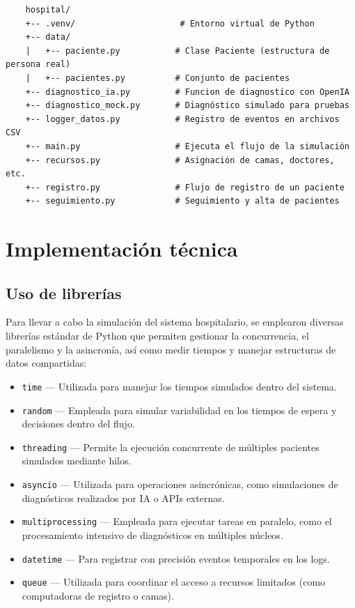 \documentclass{article}
\begin{document}
\begin{verbatim}
    hospital/
    +-- .venv/                     # Entorno virtual de Python
    +-- data/                      
    |   +-- paciente.py           # Clase Paciente (estructura de persona real) 
    |   +-- pacientes.py          # Conjunto de pacientes
    +-- diagnostico_ia.py         # Funcion de diagnostico con OpenIA
    +-- diagnostico_mock.py       # Diagnóstico simulado para pruebas
    +-- logger_datos.py           # Registro de eventos en archivos CSV
    +-- main.py                   # Ejecuta el flujo de la simulación
    +-- recursos.py               # Asignación de camas, doctores, etc.
    +-- registro.py               # Flujo de registro de un paciente
    +-- seguimiento.py            # Seguimiento y alta de pacientes
\end{verbatim}

\section{Implementación técnica}

\subsection{Uso de librerías}

Para llevar a cabo la simulación del sistema hospitalario, se emplearon diversas librerías estándar de Python que permiten gestionar la concurrencia, el paralelismo y la asincronía, así como medir tiempos y manejar estructuras de datos compartidas:

\begin{itemize}
    \item \texttt{time} — Utilizada para manejar los tiempos simulados dentro del sistema.
    \item \texttt{random} — Empleada para simular variabilidad en los tiempos de espera y decisiones dentro del flujo.
    \item \texttt{threading} — Permite la ejecución concurrente de múltiples pacientes simulados mediante hilos.
    \item \texttt{asyncio} — Utilizada para operaciones asincrónicas, como simulaciones de diagnósticos realizados por IA o APIs externas.
    \item \texttt{multiprocessing} — Empleada para ejecutar tareas en paralelo, como el procesamiento intensivo de diagnósticos en múltiples núcleos.
    \item \texttt{datetime} — Para registrar con precisión eventos temporales en los logs.
    \item \texttt{queue} — Utilizada para coordinar el acceso a recursos limitados (como computadoras de registro o camas).
\end{itemize}
\end{document}
